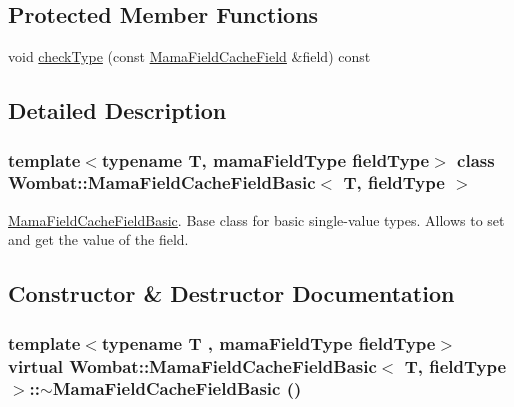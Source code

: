 \subsection*{Protected Member Functions}
\begin{DoxyCompactItemize}
\item 
void \hyperlink{classWombat_1_1MamaFieldCacheFieldBasic_ab5400d3050c6a946a1ccf111e88eee72}{checkType} (const \hyperlink{classWombat_1_1MamaFieldCacheField}{MamaFieldCacheField} \&field) const 
\end{DoxyCompactItemize}


\subsection{Detailed Description}
\subsubsection*{template$<$typename T, mamaFieldType fieldType$>$ class Wombat::MamaFieldCacheFieldBasic$<$ T, fieldType $>$}

\hyperlink{classWombat_1_1MamaFieldCacheFieldBasic}{MamaFieldCacheFieldBasic}. Base class for basic single-\/value types. Allows to set and get the value of the field. 

\subsection{Constructor \& Destructor Documentation}
\hypertarget{classWombat_1_1MamaFieldCacheFieldBasic_a9cfd91409fa496770949b2db3e0b4321}{
\subsubsection[{$\sim$MamaFieldCacheFieldBasic}]{\setlength{\rightskip}{0pt plus 5cm}template$<$typename T , mamaFieldType fieldType$>$ virtual {\bf Wombat::MamaFieldCacheFieldBasic}$<$ T, fieldType $>$::$\sim${\bf MamaFieldCacheFieldBasic} ()}}
\label{classWombat_1_1MamaFieldCacheFieldBasic_a9cfd91409fa496770949b2db3e0b4321}


